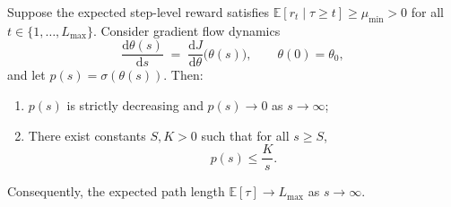 \begin{theorem}\label{thm:collapse_formal}
Suppose the expected step-level reward satisfies $\mathbb{E}[r_t \mid \tau \geq t] \geq \mu_{\min} > 0$ for all $t \in \{1, \ldots, L_{\max}\}$. Consider gradient flow dynamics
\begin{equation}
    \frac{\mathrm{d}\theta(s)}{\mathrm{d}s} \;=\; \frac{\mathrm{d}J}{\mathrm{d}\theta}\bigl(\theta(s)\bigr),
    \qquad \theta(0)=\theta_0,
\end{equation}
and let $p(s)=\sigma(\theta(s))$. Then:
\begin{enumerate}
    \item $p(s)$ is strictly decreasing and $p(s) \to 0$ as $s \to \infty$;
    \item There exist constants $S, K > 0$ such that for all $s \geq S$,
    \begin{equation}
        p(s) \leq \frac{K}{s}.
    \end{equation}
\end{enumerate}
Consequently, the expected path length $\mathbb{E}[\tau] \to L_{\max}$ as $s \to \infty$.
\end{theorem}

